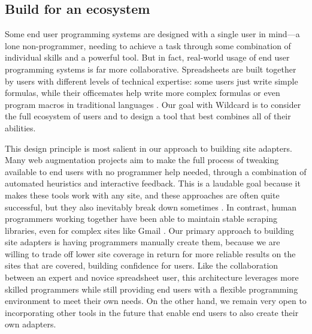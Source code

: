 \documentclass[english,submission]{programming}
\begin{document}
\hypertarget{build-for-an-ecosystem}{%
\subsection{Build for an ecosystem}\label{build-for-an-ecosystem}}

Some end user programming systems are designed with a single user in
mind---a lone non-programmer, needing to achieve a task through some
combination of individual skills and a powerful tool. But in fact,
real-world usage of end user programming systems is far more
collaborative. Spreadsheets are built together by users with different
levels of technical expertise: some users just write simple formulas,
while their officemates help write more complex formulas or even program
macros in traditional languages \autocite{nardi1990}. Our goal with
Wildcard is to consider the full ecosystem of users and to design a tool
that best combines all of their abilities.

This design principle is most salient in our approach to building site
adapters. Many web augmentation projects aim to make the full process of
tweaking available to end users with no programmer help needed, through
a combination of automated heuristics and interactive feedback. This is
a laudable goal because it makes these tools work with any site, and
these approaches are often quite successful, but they also inevitably
break down sometimes \autocite{bolin2005} \autocite{little2010}. In
contrast, human programmers working together have been able to maintain
stable scraping libraries, even for complex sites like Gmail
\autocite{streak,talwar2019}. Our primary approach to building site
adapters is having programmers manually create them, because we are
willing to trade off lower site coverage in return for more reliable
results on the sites that are covered, building confidence for users.
Like the collaboration between an expert and novice spreadsheet user,
this architecture leverages more skilled programmers while still
providing end users with a flexible programming environment to meet
their own needs. On the other hand, we remain very open to incorporating
other tools in the future that enable end users to also create their own
adapters.
\end{document}

